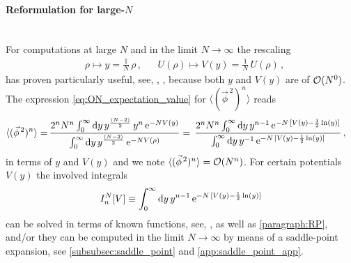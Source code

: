 \paragraph{Reformulation for large-\texorpdfstring{$N$}{N}}\label{paragraph:zerodOinfRescaling}\mbox{}\\%
For computations at large $N$ and in the limit ${N \rightarrow \infty}$ the rescaling
\begin{align}
	&	\rho \mapsto y = \tfrac{1}{N} \, \rho \, ,	&&	U ( \rho ) \mapsto V ( y ) = \tfrac{1}{N} \, U ( \rho ) \, ,	\label{eq:rescalings}
\end{align}
has proven particularly useful, see, \eg{}, , because both $y$ and $V ( y )$ are of $\mathcal{O} ( N^0 )$. The expression \eqref{eq:ON_expectation_value} for $\langle( \vec{\phi}^{\, 2} )^n\rangle$ reads
\begin{align}
	\langle ( \vec{\phi}^{\, 2} )^n \rangle = \, & \frac{2^n N^n \int_0^\infty \dif y \, y^\frac{(N - 2)}{2} \,  y^n \, \eu^{-N V ( y )}}{\int_0^\infty \dif y \, y^\frac{(N - 2)}{2} \, \eu^{-N V ( \rho )}} =\,\frac{2^n N^n \int_0^\infty \dif y \, y^{n - 1} \, \eu^{- N \, [ V ( y ) - \frac{1}{2} \ln ( y ) ]}}{\int_0^\infty \mathrm{d} y \, y^{-1} \, \eu^{- N \, [ V ( y ) - \frac{1}{2} \ln ( y ) ]}} \, ,	\label{eq:ON_expectation_value_largeN}
\end{align}
in terms of $y$ and $V ( y )$ and we note $\langle ( \vec{\phi}^{\, 2} )^n \rangle=\mathcal{O} ( N^n )$. For certain potentials $V(y)$ the involved integrals
	\begin{align}
		I_n^N [ V ] \equiv \int_0^\infty \dif y \, y^{n - 1} \, \eu^{- N \, [ V ( y ) - \frac{1}{2} \ln ( y ) ]}	\label{eq:In_largeN}
	\end{align}
can be solved in terms of known functions, see, \eg{},  as well as \cref{paragraph:RP}, and/or they can be computed in the limit ${N \rightarrow \infty}$ by means of a saddle-point expansion, see \cref{subsubsec:saddle_point} and \cref{app:saddle_point_app}.
\clearpage

